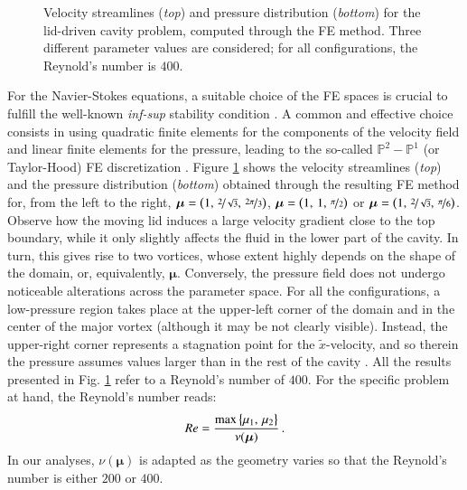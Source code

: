 \documentclass[longtitle]{elsarticle}
\numberwithin{equation}{section}
\theoremstyle{theorem}
\theoremstyle{definition}
\theoremstyle{remark}
\theoremstyle{proposition}
\numberwithin{figure}{section}
\newcommand{\wt}[1]{\widetilde{#1}}
\newcommand{\bg}[1]{\boldsymbol{#1}}
\begin{document}
\begin{figure}[t!]
			\caption{Velocity streamlines (\emph{top}) and pressure distribution (\emph{bottom}) for the lid-driven cavity problem, computed through the FE method. Three different parameter values are considered; for all configurations, the Reynold's number is $400$.}
			\label{fig:dc-solutions-different-domains}
		\end{figure}

		\clearpage

		For the Navier-Stokes equations, a suitable choice of the FE spaces is crucial to fulfill the well-known \emph{inf-sup} stability condition \cite{Ran99}. A common and effective choice consists in using quadratic finite elements for the components of the velocity field and linear finite elements for the pressure, leading to the so-called $\mathbb{P}^2 - \mathbb{P}^1$ (or Taylor-Hood) FE discretization \cite{Per02}. Figure \ref{fig:dc-solutions-different-domains} shows the velocity streamlines (\emph{top}) and the pressure distribution (\emph{bottom}) obtained through the resulting FE method for, from the left to the right, $\bg{\mu} = \big( 1, \, \nicefrac{2}{\sqrt{3}}, \, \nicefrac{2 \pi}{3} \big)$, $\bg{\mu} = \big( 1, \, 1, \, \nicefrac{\pi}{2} \big)$ or $\bg{\mu} = \big( 1, \, \nicefrac{2}{\sqrt{3}}, \, \nicefrac{\pi}{6} \big)$. Observe how the moving lid induces a large velocity gradient close to the top boundary, while it only slightly affects the fluid in the lower part of the cavity. In turn, this gives rise to two vortices, whose extent highly depends on the shape of the domain, or, equivalently, $\bg{\mu}$. Conversely, the pressure field does not undergo noticeable alterations across the parameter space. For all the configurations, a low-pressure region takes place at the upper-left corner of the domain and in the center of the major vortex (although it may be not clearly visible). Instead, the upper-right corner represents a stagnation point for the $\wt{x}$-velocity, and so therein the pressure assumes values larger than in the rest of the cavity \cite{Dho14}. All the results presented in Fig. \ref{fig:dc-solutions-different-domains} refer to a Reynold's number of $400$. For the specific problem at hand, the Reynold's number reads:
		\begin{equation*}
			\vspace*{-0.1cm}
			Re = \dfrac{\max \big\lbrace \mu_1, \, \mu_2 \big\rbrace}{\nu(\bg{\mu})} \, .
		\end{equation*}
		In our analyses, $\nu(\bg{\mu})$ is adapted as the geometry varies so that the Reynold's number is either $200$ or $400$. 
\end{document}
